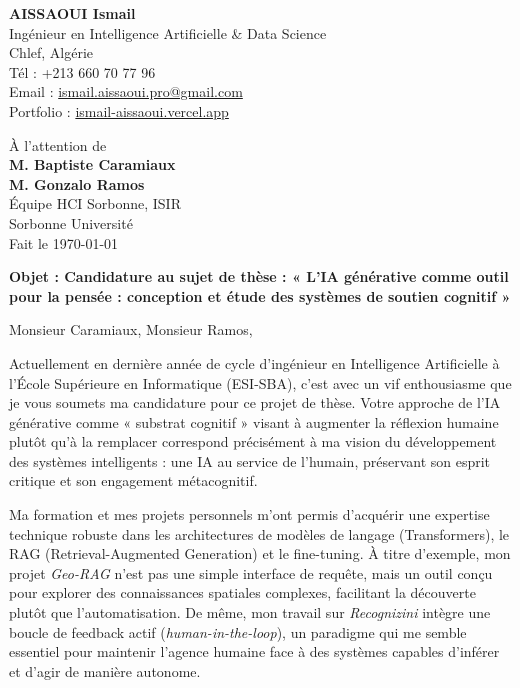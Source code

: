 \documentclass[a4paper,11pt]{article}
\begin{document}
\begin{flushleft}
    \textbf{AISSAOUI Ismail} \\
    Ingénieur en Intelligence Artificielle \& Data Science \\
    Chlef, Algérie \\
    Tél : +213 660 70 77 96 \\
    Email : \href{mailto:ismail.aissaoui.pro@gmail.com}{ismail.aissaoui.pro@gmail.com} \\
    Portfolio : \href{https://ismail-aissaoui.vercel.app}{ismail-aissaoui.vercel.app}
\end{flushleft}

\begin{flushright}
    À l'attention de \\
    \textbf{M. Baptiste Caramiaux} \\
    \textbf{M. Gonzalo Ramos} \\
    Équipe HCI Sorbonne, ISIR \\
    Sorbonne Université \\
    Fait le \today
\end{flushright}

\vspace{0.5cm}

\noindent \textbf{Objet : Candidature au sujet de thèse : « L'IA générative comme outil pour la pensée : conception et étude des systèmes de soutien cognitif »}

\vspace{0.5cm}

Monsieur Caramiaux, Monsieur Ramos,

\medskip

Actuellement en dernière année de cycle d'ingénieur en Intelligence Artificielle à l'École Supérieure en Informatique (ESI-SBA), c'est avec un vif enthousiasme que je vous soumets ma candidature pour ce projet de thèse. Votre approche de l'IA générative comme « substrat cognitif » visant à augmenter la réflexion humaine plutôt qu’à la remplacer correspond précisément à ma vision du développement des systèmes intelligents : une IA au service de l'humain, préservant son esprit critique et son engagement métacognitif.

Ma formation et mes projets personnels m’ont permis d’acquérir une expertise technique robuste dans les architectures de modèles de langage (Transformers), le RAG (Retrieval-Augmented Generation) et le fine-tuning. À titre d'exemple, mon projet \textit{Geo-RAG} n'est pas une simple interface de requête, mais un outil conçu pour explorer des connaissances spatiales complexes, facilitant la découverte plutôt que l’automatisation. De même, mon travail sur \textit{Recognizini} intègre une boucle de feedback actif (\textit{human-in-the-loop}), un paradigme qui me semble essentiel pour maintenir l'agence humaine face à des systèmes capables d'inférer et d'agir de manière autonome.
\end{document}
